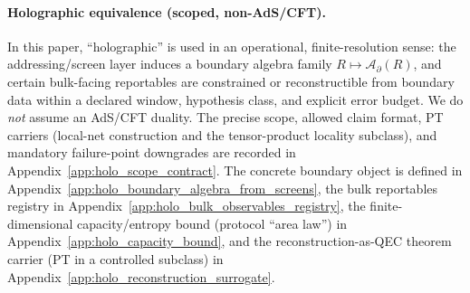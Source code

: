 \paragraph{Holographic equivalence (scoped, non-AdS/CFT).}
\InterfaceTag In this paper, ``holographic'' is used in an operational, finite-resolution sense:
the addressing/screen layer induces a boundary algebra family $R\mapsto \mathcal{A}_{\partial}(R)$, and certain bulk-facing
reportables are constrained or reconstructible from boundary data within a declared window, hypothesis class, and explicit error budget.
We do \emph{not} assume an AdS/CFT duality.
The precise scope, allowed claim format, PT carriers (local-net construction and the tensor-product locality subclass),
and mandatory failure-point downgrades are recorded in Appendix~\ref{app:holo_scope_contract}.
The concrete boundary object is defined in Appendix~\ref{app:holo_boundary_algebra_from_screens}, the bulk reportables registry in
Appendix~\ref{app:holo_bulk_observables_registry}, the finite-dimensional capacity/entropy bound (protocol ``area law'') in
Appendix~\ref{app:holo_capacity_bound}, and the reconstruction-as-QEC theorem carrier (PT in a controlled subclass) in
Appendix~\ref{app:holo_reconstruction_surrogate}.

